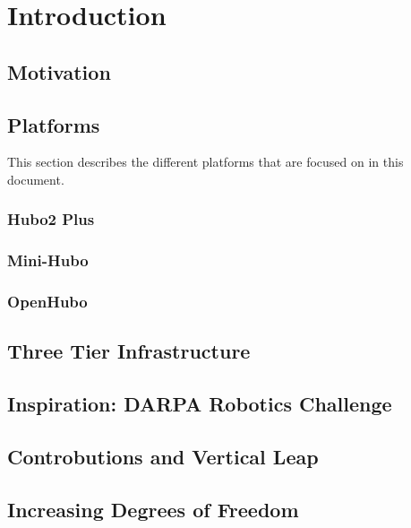 \chapter{Introduction}
	


	\section{Motivation}\label{sec:roadmap}	
		

	\section{Platforms}\label{sec:robots}
	This section describes the different platforms that are focused on in this document.
		\subsection{Hubo2 Plus}\label{sec:hubo}
			
		\subsection{Mini-Hubo}\label{sec:mini-hubo}
			
		\subsection{OpenHubo}\label{sec:openhubo}
			
		








	\section{Three Tier Infrastructure}\label{sec:threeTier}
		



	\section{Inspiration: DARPA Robotics Challenge}\label{sec:drc}
    		

    	\section{Controbutions and Vertical Leap}
		

   	\section{Increasing Degrees of Freedom}\label{sec:numdof}
		



			
			
			
			
			

	

